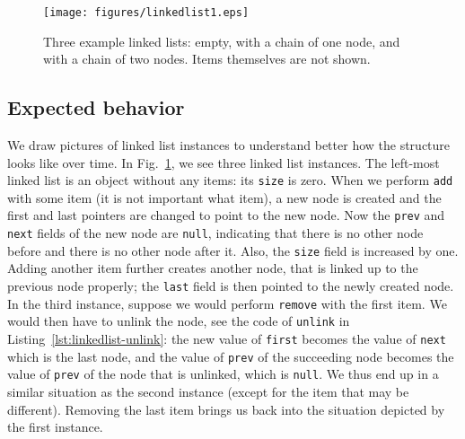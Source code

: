 \documentclass[runningheads]{llncs}
\begin{document}
\begin{figure}
  \centering
  \texttt{[image: figures/linkedlist1.eps]}
  \caption{Three example linked lists: empty, with a chain of one node, and with a chain of two nodes. Items themselves are not shown.}
  \vspace*{-20pt}
  \label{fig:linkedlist}
\end{figure}

\subsection{Expected behavior}

We draw pictures of linked list instances to understand better how the structure looks like over time. In Fig.~\ref{fig:linkedlist}, we see three linked list instances. The left-most linked list is an object without any items: its \texttt{size} is zero. When we perform \texttt{add} with some item (it is not important what item), a new node is created and the first and last pointers are changed to point to the new node. Now the \texttt{prev} and \texttt{next} fields of the new node are \texttt{null}, indicating that there is no other node before and there is no other node after it. Also, the \texttt{size} field is increased by one. Adding another item further creates another node, that is linked up to the previous node properly; the \texttt{last} field is then pointed to the newly created node.
In the third instance, suppose we would perform \texttt{remove} with the first item. We would then have to unlink the node, see the code of \texttt{unlink} in Listing~\ref{lst:linkedlist-unlink}: the new value of \texttt{first} becomes the value of \texttt{next} which is the last node, and the value of \texttt{prev} of the succeeding node becomes the value of \texttt{prev} of the node that is unlinked, which is \texttt{null}. We thus end up in a similar situation as the second instance (except for the item that may be different). Removing the last item brings us back into the situation depicted by the first instance.
\end{document}

